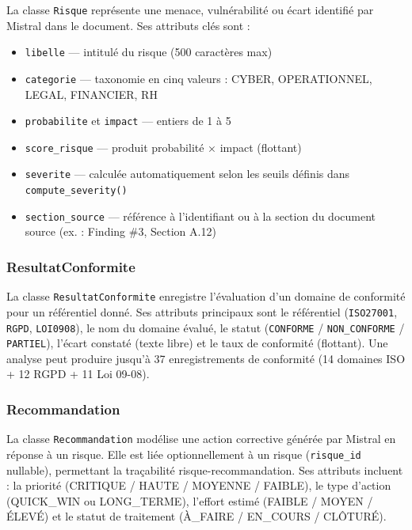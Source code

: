 La classe \texttt{Risque} représente une menace, vulnérabilité ou écart
identifié par Mistral dans le document. Ses attributs clés sont :
\begin{itemize}
  \item \texttt{libelle} — intitulé du risque (500 caractères max)
  \item \texttt{categorie} — taxonomie en cinq valeurs : CYBER,
    OPERATIONNEL, LEGAL, FINANCIER, RH
  \item \texttt{probabilite} et \texttt{impact} — entiers de 1 à 5
  \item \texttt{score\_risque} — produit probabilité × impact (flottant)
  \item \texttt{severite} — calculée automatiquement selon les seuils
    définis dans \texttt{compute\_severity()}
  \item \texttt{section\_source} — référence à l'identifiant ou à la
    section du document source (ex. : \og{}Finding \#3\fg{},
    \og{}Section A.12\fg{})
\end{itemize}

\subsubsection*{ResultatConformite}

La classe \texttt{ResultatConformite} enregistre l'évaluation d'un domaine
de conformité pour un référentiel donné. Ses attributs principaux sont
le référentiel (\texttt{ISO27001}, \texttt{RGPD}, \texttt{LOI0908}), le
nom du domaine évalué, le statut (\texttt{CONFORME} / \texttt{NON\_CONFORME}
/ \texttt{PARTIEL}), l'écart constaté (texte libre) et le taux de
conformité (flottant). Une analyse peut produire jusqu'à 37 enregistrements
de conformité (14 domaines ISO + 12 RGPD + 11 Loi 09-08).

\subsubsection*{Recommandation}

La classe \texttt{Recommandation} modélise une action corrective générée
par Mistral en réponse à un risque. Elle est liée optionnellement à un
risque (\texttt{risque\_id} nullable), permettant la traçabilité
risque-recommandation. Ses attributs incluent : la priorité (CRITIQUE /
HAUTE / MOYENNE / FAIBLE), le type d'action (QUICK\_WIN ou LONG\_TERME),
l'effort estimé (FAIBLE / MOYEN / ÉLEVÉ) et le statut de traitement
(À\_FAIRE / EN\_COURS / CLÔTURÉ).

